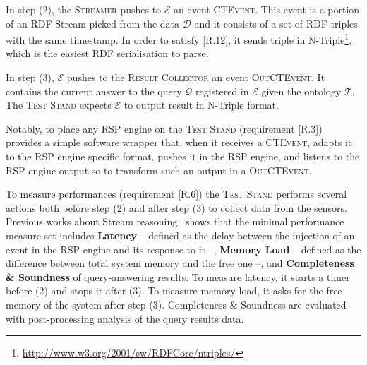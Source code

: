                                                                                                                                                                                                                                                                                                                                                                                                                                                                                                                                                                                                                                                                                                                                                                                                                                                                                                                                                                                                                                                                                                                                                                                                                                              

In step (2), the \textsc{Streamer} pushes to $\mathcal{E}$ an event \textsc{CTEvent}. This event is a portion of an RDF Stream picked from the data $\mathcal{D}$ and it consists of a set of RDF triples with the same timestamp. In order to satisfy [R.12], it sends triple in N-Triple\footnote{\url{http://www.w3.org/2001/sw/RDFCore/ntriples/}}, which is the easiest RDF serialisation to parse.  


In step (3), $\mathcal{E}$ pushes to the \textsc{Result Collector} an event \textsc{OutCTEvent}. It contains the current answer to the query $\mathcal{Q}$ registered in $\mathcal{E}$ given the ontology $\mathcal{T}$. The \textsc{Test Stand} expects $\mathcal{E}$ to output result in N-Triple format. 

Notably, to place any RSP engine on the \textsc{Test Stand} (requirement [R.3]) \name provides a simple software wrapper that, when it receives a \textsc{CTEvent}, adapts it to the RSP engine specific format, pushes it in the RSP engine, and listens to the RSP engine output so to transform such an output in a \textsc{OutCTEvent}.

To measure performances (requirement [R.6]) the \textsc{Test Stand} performs several actions both before step (2) and after step (3) to collect data from the sensors. Previous works about Stream reasoning~\cite{DBLP:conf/esws/ScharrenbachUMVB13} shows that the minimal performance measure set includes \textbf{Latency} -- defined as the delay between the injection of an event in the RSP engine and its response to it --, \textbf{Memory Load} -- defined as the difference between total system memory and the free one --, and \textbf{Completeness \& Soundness} of query-answering results. To measure latency, it starts a timer before (2) and stops it after (3). To measure memory load, it asks for the free memory of the system after step (3). Completeness \& Soundness are evaluated with post-processing analysis of the query results data.

